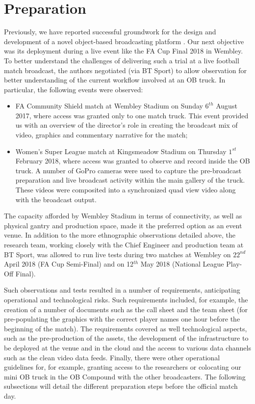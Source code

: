 \documentclass[sigchi-a, authorversion]{acmart}
\begin{document}
\section{Preparation}
Previously, we have reported successful groundwork for the design and development
of a novel object-based broadcasting platform \cite{kegel2017, Li:2018_CHI, Li:2018_TVX}.
Our next objective was its deployment during a live event like the FA Cup Final
2018 in Wembley. To better understand the challenges of delivering such a trial at
a live football match broadcast, the authors negotiated (via BT Sport) to allow
observation for better understanding of the current workflow involved at an OB
truck. In particular, the following events were observed:

\begin{itemize}
  \item FA Community Shield match at Wembley Stadium on Sunday $6^{th}$ August 2017,
        where access was granted only to one match truck. This event provided us
        with an overview of the director's role in creating the broadcast mix of
        video, graphics and commentary narrative for the match;
  \item Women's Super League match at Kingsmeadow Stadium on Thursday $1^{st}$
        February 2018, where access was granted to observe and record inside the OB
        truck. A number of GoPro cameras were used to capture the pre-broadcast
        preparation and live broadcast activity within the main gallery of the
        truck. These videos were composited into a synchronized quad view video
        along with the broadcast output.
\end{itemize}

The capacity afforded by Wembley Stadium in terms of connectivity,
as well as physical gantry and production space, made it the preferred option as
an event venue. In addition to the more ethnographic observations detailed above,
the research team, working closely with the Chief Engineer and production team
at BT Sport, was allowed to run live tests during two matches at Wembley on $22^{nd}$
April 2018 (FA Cup Semi-Final) and on 12$^{th}$ May 2018 (National League Play-Off Final).

Such observations and tests resulted in a number of requirements, anticipating
operational and technological risks. Such requirements included, for example,
the creation of a number of documents such as the call sheet and the team sheet
(for pre-populating the graphics with the correct player names one hour before
the beginning of the match). The requirements covered as well technological
aspects, such as the pre-production of the assets, the development of the
infrastructure to be deployed at the venue and in the cloud and the access to
various data channels such as the clean video data feeds. Finally, there were
other operational guidelines for, for example, granting access to the researchers
or colocating our mini OB truck in the OB Compound with the other broadcasters.
The following subsections will detail the different preparation steps before the
official match day.
\end{document}
